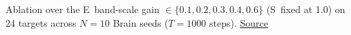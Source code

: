 Ablation over the E\textpm\ band-scale gain $\in \{0.1, 0.2, 0.3, 0.4, 0.6\}$ (S\textpm\ fixed at 1.0) on 24 targets across $N=10$ Brain seeds ($T=1000$ steps). \href{https://github.com/tahmidazam/gg4/blob/main/notebooks/cartesian_control_ablation_band_scale/cartesian_control_ablation_band_scale.ipynb}{\underline{Source}}%